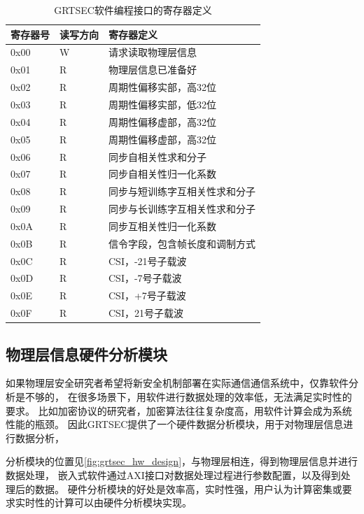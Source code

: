 		\begin{table}[!hbp]
		\centering
		\caption{GRTSEC软件编程接口的寄存器定义}
		\label{tab:grtsec_axi_reg_define}
			\begin{tabular}{|l|l|l|} \hline
			寄存器号 & 读写方向 & 寄存器定义 \\ \hline
			0x00 & W & 请求读取物理层信息 \\ \hline
			0x01 & R & 物理层信息已准备好 \\ \hline
			0x02 & R & 周期性偏移实部，高32位 \\ \hline
			0x03 & R & 周期性偏移实部，低32位 \\ \hline
			0x04 & R & 周期性偏移虚部，高32位 \\ \hline
			0x05 & R & 周期性偏移虚部，高32位 \\ \hline
			0x06 & R & 同步自相关性求和分子 \\ \hline
			0x07 & R & 同步自相关性归一化系数 \\ \hline
			0x08 & R & 同步与短训练字互相关性求和分子 \\ \hline
			0x09 & R & 同步与长训练字互相关性求和分子 \\ \hline
			0x0A & R & 同步互相关性归一化系数 \\ \hline
			0x0B & R & 信令字段，包含帧长度和调制方式 \\ \hline
			0x0C & R & CSI，-21号子载波 \\ \hline
			0x0D & R & CSI，-7号子载波 \\ \hline
			0x0E & R & CSI，+7号子载波 \\ \hline
			0x0F & R & CSI，21号子载波 \\ \hline
			\end{tabular}
		\end{table}

		\subsection{物理层信息硬件分析模块}\label{subsec:grtsec_phyinfo_analyzer}
		如果物理层安全研究者希望将新安全机制部署在实际通信通信系统中，仅靠软件分析是不够的，
		在很多场景下，用软件进行数据处理的效率低，无法满足实时性的要求。
		比如加密协议的研究者，加密算法往往复杂度高，用软件计算会成为系统性能的瓶颈。
		因此GRTSEC提供了一个硬件数据分析模块，用于对物理层信息进行数据分析，

		分析模块的位置见\ref{fig:grtsec_hw_design}，与物理层相连，得到物理层信息并进行数据处理，
		嵌入式软件通过AXI接口对数据处理过程进行参数配置，以及得到处理后的数据。
		硬件分析模块的好处是效率高，实时性强，用户认为计算密集或要求实时性的计算可以由硬件分析模块实现。

